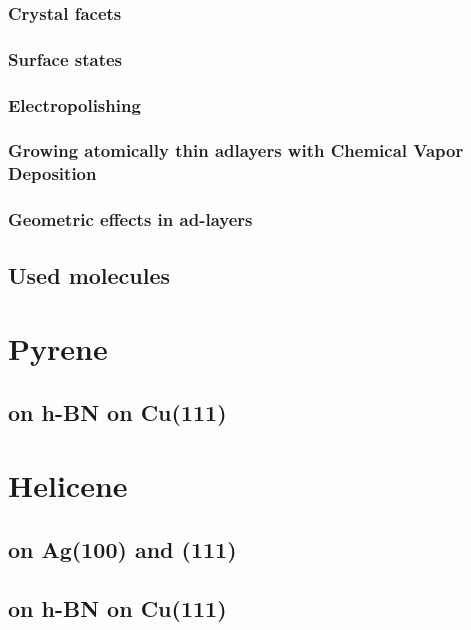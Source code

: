 \documentclass[10pt,a4paper,twoside
,BCOR=8mm				%
,headings=normal		%
,headsepline			%
,footsepline			%
,plainfootsepline		%
]{scrbook}
\begin{document}
     \subsection{Crystal facets}
        
     \subsection{Surface states}
		
     \subsection{Electropolishing}
    	
     \subsection{Growing atomically thin adlayers with \textbf{C}hemical \textbf{V}apor \textbf{D}eposition}
             
     \subsection{Geometric effects in ad-layers}
		
  \section{Used molecules}
    
\chapter{Pyrene}
\section{on h-BN on Cu(111)}

\chapter{Helicene}
\section{on Ag(100) and (111)}
\section{on h-BN on Cu(111)}

\end{document}
